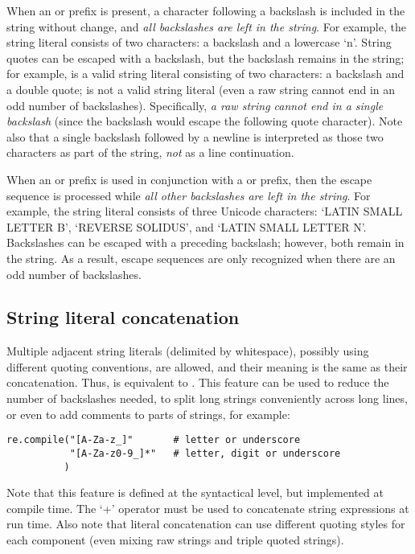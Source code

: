 When an  or  prefix is present, a character
following a backslash is included in the string without change, and
\emph{all backslashes are left in the string}.  For example, the
string literal  consists of two characters: a backslash
and a lowercase `n'.  String quotes can be escaped with a backslash,
but the backslash remains in the string; for example,  is
a valid string literal consisting of two characters: a backslash and a
double quote;  is not a valid string literal (even a raw
string cannot end in an odd number of backslashes).  Specifically,
\emph{a raw string cannot end in a single backslash} (since the
backslash would escape the following quote character).  Note also that
a single backslash followed by a newline is interpreted as those two
characters as part of the string, \emph{not} as a line continuation.

When an  or  prefix is used in conjunction
with a  or  prefix, then the 
escape sequence is processed while \emph{all other backslashes are
left in the string}.  For example, the string literal
 consists of three Unicode characters:
`LATIN SMALL LETTER B', `REVERSE SOLIDUS', and `LATIN SMALL LETTER N'.
Backslashes can be escaped with a preceding backslash; however, both
remain in the string.  As a result,  escape sequences
are only recognized when there are an odd number of backslashes.

\subsection{String literal concatenation\label{string-catenation}}

Multiple adjacent string literals (delimited by whitespace), possibly
using different quoting conventions, are allowed, and their meaning is
the same as their concatenation.  Thus,  is
equivalent to .  This feature can be used to reduce
the number of backslashes needed, to split long strings conveniently
across long lines, or even to add comments to parts of strings, for
example:

\begin{verbatim}
re.compile("[A-Za-z_]"       # letter or underscore
           "[A-Za-z0-9_]*"   # letter, digit or underscore
          )
\end{verbatim}

Note that this feature is defined at the syntactical level, but
implemented at compile time.  The `+' operator must be used to
concatenate string expressions at run time.  Also note that literal
concatenation can use different quoting styles for each component
(even mixing raw strings and triple quoted strings).


